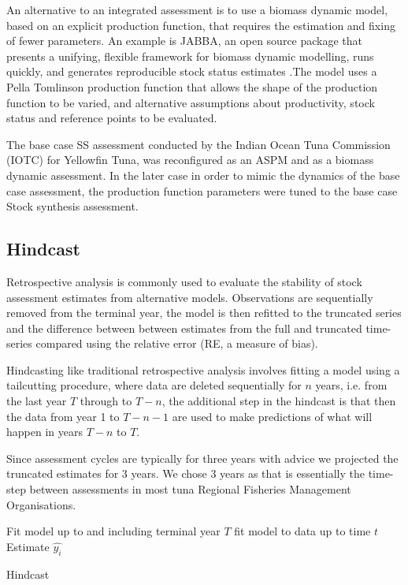 \documentclass[12pt,halfline,a4paper,nonumbib]{ouparticle}
\begin{document}
An alternative to an integrated assessment is to use a biomass dynamic model, based on an explicit production function, that requires the estimation and fixing of fewer parameters. An example is JABBA, an open source package that presents a unifying, flexible framework for biomass dynamic modelling, runs quickly, and generates reproducible stock status estimates \parencite{winker2018jabba}.The model uses a Pella Tomlinson production function that allows the shape of the production function to be varied, and alternative assumptions about productivity, stock status and reference points to be evaluated. 

The base case SS assessment conducted by the Indian Ocean Tuna Commission (IOTC) for Yellowfin Tuna, was reconfigured as an ASPM and as a biomass dynamic assessment. In the later case in order to mimic the dynamics of the base case assessment, the production function parameters were tuned to the base case Stock synthesis assessment. 

\subsection{Hindcast}

Retrospective analysis \parencite{hurtado2014looking} is commonly used to evaluate the stability of stock assessment estimates from alternative models. Observations are sequentially removed from the terminal year, the model is then refitted to the truncated series and the difference between between estimates from the full and truncated time-series compared using the relative error (RE, a measure of bias). 

Hindcasting like traditional retrospective analysis involves fitting a model using a tailcutting procedure, where data are deleted sequentially for $n$ years, i.e. from the last year $T$ through to $T−n$, the additional step in the hindcast is that then the data from year 1 to $T - n - 1$ are used to make predictions of what will happen in years $T - n$ to $T$.

Since assessment cycles are typically for three years  with advice \parencite{fricker2013three} we projected the truncated estimates for 3 years. We chose 3 years as that is essentially the time-step between assessments in most tuna Regional Fisheries Management Organisations.

\begin{algorithm}[!ht]
\begin{algorithmic}[1]
\State Fit model up to and including terminal year $T$
\State fit model to data up to time $t$  
\State Estimate $\hat{y_i}$
\EndFor
\EndFor
\caption{Hindcast}
\label{Hindcast}
\end{algorithmic}
\end{algorithm}
\end{document}
